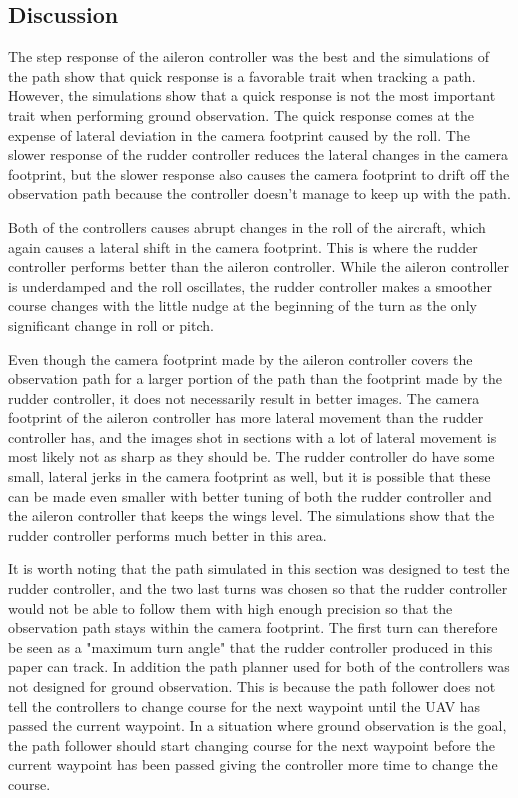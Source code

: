 \subsection{Discussion}

The step response of the aileron controller was the best and the simulations of the path show that quick response is a favorable trait when tracking a path. However, the simulations show that a quick response is not the most important trait when performing ground observation. The quick response comes at the expense of lateral deviation in the camera footprint caused by the roll. The slower response of the rudder controller reduces the lateral changes in the camera footprint, but the slower response also causes the camera footprint to drift off the observation path because the controller doesn't manage to keep up with the path.

Both of the controllers causes abrupt changes in the roll of the aircraft, which again causes a lateral shift in the camera footprint. This is where the rudder controller performs better than the aileron controller. While the aileron controller is underdamped and the roll oscillates, the rudder controller makes a smoother course changes with the little nudge at the beginning of the turn as the only significant change in roll or pitch.

Even though the camera footprint made by the aileron controller covers the observation path for a larger portion of the path than the footprint made by the rudder controller, it does not necessarily result in better images. The camera footprint of the aileron controller has more lateral movement than the rudder controller has, and the images shot in sections with a lot of lateral movement is most likely not as sharp as they should be. The rudder controller do have some small, lateral jerks in the camera footprint as well, but it is possible that these can be made even smaller with better tuning of both the rudder controller and the aileron controller that keeps the wings level. The simulations show that the rudder controller performs much better in this area.

It is worth noting that the path simulated in this section was designed to test the rudder controller, and the two last turns was chosen so that the rudder controller would not be able to follow them with high enough precision so that the observation path stays within the camera footprint. The first turn can therefore be seen as a "maximum turn angle" that the rudder controller produced in this paper can track. In addition the path planner used for both of the controllers was not designed for ground observation. This is because the path follower does not tell the controllers to change course for the next waypoint until the UAV has passed the current waypoint. In a situation where ground observation is the goal, the path follower should start changing course for the next waypoint before the current waypoint has been passed giving the controller more time to change the course.

